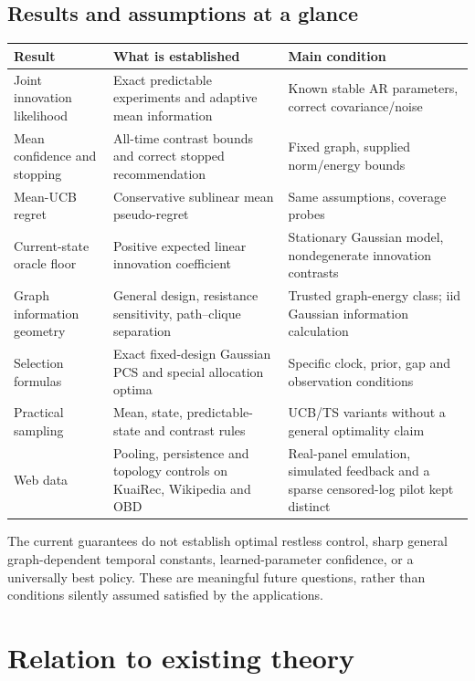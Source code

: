 \subsection{Results and assumptions at a glance}
\begin{center}\small
\begin{tabular}{>{\raggedright\arraybackslash}p{}>{\raggedright\arraybackslash}p{}>{\raggedright\arraybackslash}p{}}
\toprule
Result & What is established & Main condition \\
\midrule
Joint innovation likelihood & Exact predictable experiments and adaptive mean information & Known stable AR parameters, correct covariance/noise \\
Mean confidence and stopping & All-time contrast bounds and correct stopped recommendation & Fixed graph, supplied norm/energy bounds \\
Mean-UCB regret & Conservative sublinear mean pseudo-regret & Same assumptions, coverage probes \\
Current-state oracle floor & Positive expected linear innovation coefficient & Stationary Gaussian model, nondegenerate innovation contrasts \\
Graph information geometry & General design, resistance sensitivity, path--clique separation & Trusted graph-energy class; iid Gaussian information calculation \\
Selection formulas & Exact fixed-design Gaussian PCS and special allocation optima & Specific clock, prior, gap and observation conditions \\
Practical sampling & Mean, state, predictable-state and contrast rules & UCB/TS variants without a general optimality claim \\
Web data & Pooling, persistence and topology controls on KuaiRec, Wikipedia and OBD & Real-panel emulation, simulated feedback and a sparse censored-log pilot kept distinct \\
\bottomrule
\end{tabular}\end{center}

The current guarantees do not establish optimal restless control, sharp general graph-dependent temporal constants, learned-parameter confidence, or a universally best policy. These are meaningful future questions, rather than conditions silently assumed satisfied by the applications.

\section{Relation to existing theory}

